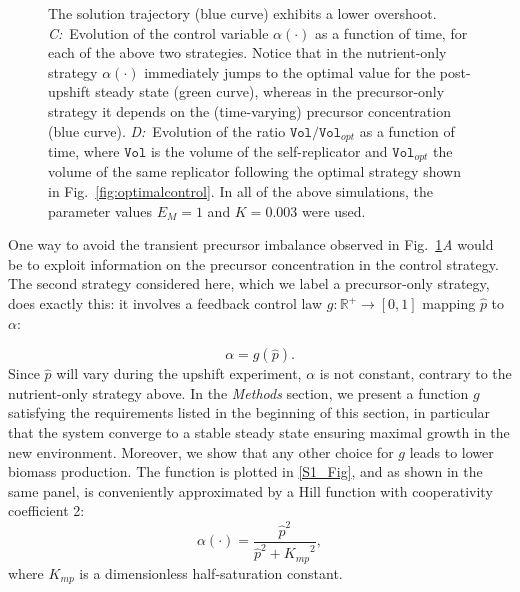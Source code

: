 \begin{figure}[p]
{The solution trajectory (blue curve) exhibits a lower overshoot.
\textit{C:}~Evolution of the control variable $\alpha(\cdot)$ as a function of time, for each of the above two strategies.
Notice that in the nutrient-only strategy $\alpha(\cdot)$ immediately jumps to the optimal value for the post-upshift steady state (green curve), whereas in the precursor-only strategy it depends on the (time-varying) precursor concentration (blue curve).
\textit{D:}~Evolution of the ratio $\texttt{Vol} / \texttt{Vol}_{opt}$  as a function of time, where $\texttt{Vol}$ is the volume of the self-replicator and $\texttt{Vol}_{opt}$ the volume of the same replicator following the optimal strategy shown in Fig.~\ref{fig:optimalcontrol}.
In all of the above simulations, the parameter values $E_M=1$ and $K=0.003$ were used.
}
\label{fig:comparison_nutrients_precursor}
\end{figure}

One way to avoid the transient precursor imbalance observed in Fig.~\ref{fig:comparison_nutrients_precursor}\textit{A} would be to exploit information on the precursor concentration in the control strategy.
The second strategy considered here, which we label a precursor-only strategy, does exactly this: it involves a feedback control law $g \colon \mathbb{R}^+ \to [0,1]$ mapping $\hat{p}$ to $\alpha$:

\begin{equation}
\alpha = g(\hat{p}).
\label{eq:precursorstrategy}
\end{equation}
Since $\hat{p}$ will vary during the upshift experiment, $\alpha$ is not constant, contrary to the nutrient-only strategy above.
In the \textit{Methods} section, we present a function $g$ satisfying the requirements listed in the beginning of this section, in particular that the system converge to a stable steady state ensuring maximal growth in the new environment.
Moreover, we show that any other choice for $g$ leads to lower biomass production.
The function is plotted in \ref{S1_Fig}, and as shown in the same panel, is conveniently approximated by a Hill function with cooperativity coefficient 2:
\begin{equation}\label{eq:HillApprox}
\alpha (\cdot)= \dfrac{\hat{p}^2}{\hat{p}^2 + {K_{mp}}^2},
\end{equation}
where $K_{mp}$ is a dimensionless half-saturation constant.

